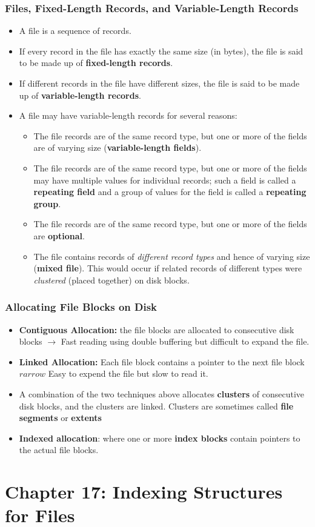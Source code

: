 \documentclass[10pt]{article}
\newcommand{\tf}{\textbf}
\newcommand{\ti}{\textit}
\newcommand{\rarrow}{\rightarrow}
\begin{document}
\subsubsection{Files, Fixed-Length Records, and Variable-Length Records}

\begin{itemize}
	\item A file is a sequence of records. 
	\item If every record in the file has exactly the same size (in bytes), the file is said to be made up of \tf{fixed-length records}. 
	\item If different records in the file have different sizes, the file is said to be made up of \tf{variable-length records}.
	\item A file may have variable-length records for several reasons: 
	\begin{itemize}
		\item The file records are of the same record type, but one or more of the fields are of varying size (\tf{variable-length fields}).
		\item The file records are of the same record type, but one or more of the fields may have multiple values for individual records; such a field is called a \tf{repeating field} and a group of values for the field is called a \tf{repeating group}.
		\item The file records are of the same record type, but one or more of the fields are \tf{optional}.
		\item The file contains records of \ti{different record types} and hence of varying size (\tf{mixed file}). This would occur if related records of different types were \ti{clustered} (placed together) on disk blocks.  
	\end{itemize}
\end{itemize}

\subsubsection{Allocating File Blocks on Disk}

\begin{itemize}
	\item \tf{Contiguous Allocation:} the file blocks are allocated to consecutive disk blocks $\rarrow$ Fast reading using double buffering but difficult to expand the file.
	\item \tf{Linked Allocation:} Each file block contains a pointer to the next file block $rarrow$ Easy to expend the file but slow to read it. 
	\item A combination of the two techniques above allocates \tf{clusters} of consecutive disk blocks, and the clusters are linked. Clusters are sometimes called \tf{file segments} or \tf{extents}
	\item \tf{Indexed allocation}: where one or more \tf{index blocks} contain pointers to the actual file blocks.  
\end{itemize}

\section{Chapter 17: Indexing Structures for Files}
\end{document}
